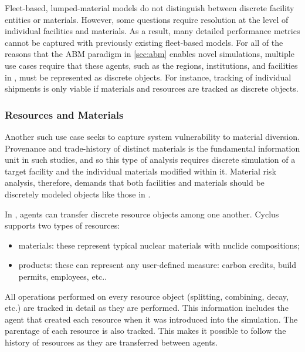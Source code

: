 Fleet-based, lumped-material models do not distinguish between discrete facility
entities or materials. However, some questions require resolution at the level
of individual facilities and materials.  As a result, many detailed performance
metrics cannot be captured with previously existing fleet-based models. For all
of the reasons that the \gls{ABM} paradigm in \ref{sec:abm} enables novel
simulations, multiple use cases require that these agents, such as the regions,
institutions, and facilities in \Cyclus, must be represented as discrete
objects. For instance, tracking of individual shipments is only viable if materials and
resources are tracked as discrete objects.

\subsubsection{Resources and Materials}

Another such use case seeks to capture system vulnerability to
material diversion. Provenance and trade-history of distinct materials is the fundamental
information unit in such studies, and so this type of analysis requires
 discrete simulation of a
target facility and the individual materials modified within it.
Material risk analysis, therefore, demands that both facilities and materials
should be discretely modeled objects like those in \Cyclus.

In \Cyclus, agents can transfer discrete resource objects among one another.
Cyclus supports two types of resources:

\begin{itemize}

  \item materials: these represent typical nuclear materials with
      nuclide compositions;

  \item products: these can represent any user-defined measure: carbon
      credits, build permits, employees, etc..

\end{itemize}

All operations performed on every resource object (splitting, combining,
decay, etc.) are tracked in detail as they are performed.  This information
includes the agent that created each resource when it was introduced into the
simulation.  The parentage of each resource is also tracked. This makes it
possible to follow the history of resources as they are transferred between
agents.

